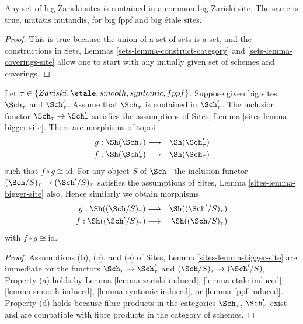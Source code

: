 \begin{lemma}
\label{lemma-contained-in}
Any set of big Zariski sites is contained in a common big Zariski site.
The same is true, mutatis mutandis, for big fppf and big \'etale sites.
\end{lemma}

\begin{proof}
This is true because the union of a set of sets is a set, and the
constructions in Sets, Lemmas \ref{sets-lemma-construct-category} and
\ref{sets-lemma-coverings-site}
allow one to start with any initially given set of schemes
and coverings.
\end{proof}

\begin{lemma}
\label{lemma-change-alpha}
Let $\tau \in \{Zariski, \etale, smooth, syntomic, fppf\}$.
Suppose given big sites $\Sch_\tau$ and $\Sch'_\tau$.
Assume that $\Sch_\tau$ is contained in $\Sch'_\tau$.
The inclusion functor $\Sch_\tau \to \Sch'_\tau$ satisfies
the assumptions of Sites, Lemma \ref{sites-lemma-bigger-site}.
There are morphisms of topoi
\begin{eqnarray*}
g : \Sh(\Sch_\tau) &
\longrightarrow &
\Sh(\Sch'_\tau) \\
f : \Sh(\Sch'_\tau) &
\longrightarrow &
\Sh(\Sch_\tau)
\end{eqnarray*}
such that $f \circ g \cong \text{id}$. For any object $S$
of $\Sch_\tau$ the inclusion functor
$(\Sch/S)_\tau \to (\Sch'/S)_\tau$ satisfies
the assumptions of Sites, Lemma \ref{sites-lemma-bigger-site}
also. Hence similarly we obtain morphisms
\begin{eqnarray*}
g : \Sh((\Sch/S)_\tau) &
\longrightarrow &
\Sh((\Sch'/S)_\tau) \\
f : \Sh((\Sch'/S)_\tau) &
\longrightarrow &
\Sh((\Sch/S)_\tau)
\end{eqnarray*}
with $f \circ g \cong \text{id}$.
\end{lemma}

\begin{proof}
Assumptions (b), (c), and (e) of
Sites, Lemma \ref{sites-lemma-bigger-site}
are immediate for the functors
$\Sch_\tau \to \Sch'_\tau$ and
$(\Sch/S)_\tau \to (\Sch'/S)_\tau$. Property (a) holds by
Lemma \ref{lemma-zariski-induced},
\ref{lemma-etale-induced},
\ref{lemma-smooth-induced},
\ref{lemma-syntomic-induced}, or
\ref{lemma-fppf-induced}.
Property (d) holds because
fibre products in the categories $\Sch_\tau$, $\Sch'_\tau$
exist and are compatible with fibre products in the category of schemes.
\end{proof}

